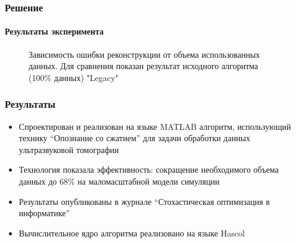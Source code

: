 \documentclass{beamer}
\begin{document}
\begin{frame}
\frametitle{Решение}
\framesubtitle{Результаты эксперимента}
\begin{figure}[h]
\centering
    \caption{\small Зависимость ошибки реконструкции от объема использованных данных. Для сравнения показан результат исходного алгоритма (100\% данных) "Legacy"}
\end{figure}

\end{frame}



\begin{frame}
\frametitle{Результаты}
\begin{itemize}\small
\item Спроектирован и реализован на языке MATLAB алгоритм, использующий технику ``Опознание со сжатием'' для задачи обработки данных ультразвуковой томографии
\item Технология показала эффективность: сокращение необходимого объема данных до 68\% на маломасштабной модели симуляции
\item Результаты опубликованы в журнале ``Стохастическая оптимизация в информатике''
\item Вычислительное ядро алгоритма реализовано на языке Hascol
\end{itemize}


\end{frame}
\end{document}
